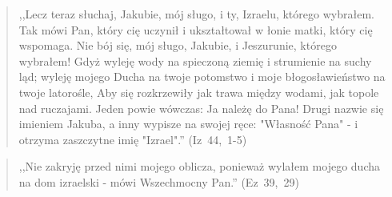 \documentclass[10pt,a4paper,oneside]{article}
\begin{document}
\begin{quote}
,,Lecz teraz słuchaj, Jakubie, mój sługo, i ty, Izraelu, którego wybrałem. Tak mówi Pan, który cię uczynił i ukształtował w łonie matki, który cię wspomaga. Nie bój się, mój sługo, Jakubie, i Jeszurunie, którego wybrałem! Gdyż wyleję wody na spieczoną ziemię i strumienie na suchy ląd; wyleję mojego Ducha na twoje potomstwo i moje błogosławieństwo na twoje latorośle, Aby się rozkrzewiły jak trawa między wodami, jak topole nad ruczajami. Jeden powie wówczas: Ja należę do Pana! Drugi nazwie się imieniem Jakuba, a inny wypisze na swojej ręce: "Własność Pana" - i otrzyma zaszczytne imię "Izrael".'' \mbox{(Iz 44, 1-5)}
\end{quote}
\begin{quote}
,,Nie zakryję przed nimi mojego oblicza, ponieważ wylałem mojego ducha na dom izraelski - mówi Wszechmocny Pan.'' \mbox{(Ez 39, 29)}
\end{quote}
\end{document}
